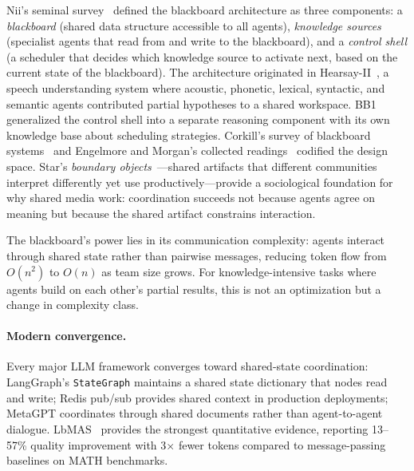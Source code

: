 \documentclass{article}
\begin{document}
Nii's seminal survey~\citep{nii1986blackboard} defined the blackboard architecture as
three components: a \emph{blackboard} (shared data structure accessible to all agents),
\emph{knowledge sources} (specialist agents that read from and write to the blackboard),
and a \emph{control shell} (a scheduler that decides which knowledge source to activate
next, based on the current state of the blackboard). The architecture originated in
Hearsay-II~\citep{erman1980hearsay}, a speech understanding system where acoustic,
phonetic, lexical, syntactic, and semantic agents contributed partial hypotheses to a
shared workspace. BB1~\citep{hayes1985bb1} generalized the control shell into a separate
reasoning component with its own knowledge base about scheduling strategies.
Corkill's survey of blackboard systems~\citep{sutra15605_blackboard1989} and
Engelmore and Morgan's collected readings~\citep{sutra14058_blackboard1985}
codified the design space. Star's \emph{boundary objects}~\citep{sutra19540_structure1989}---shared
artifacts that different communities interpret differently yet use
productively---provide a sociological foundation for why shared media work:
coordination succeeds not because agents agree on meaning but because the shared
artifact constrains interaction.

The blackboard's power lies in its communication complexity: agents interact through
shared state rather than pairwise messages, reducing token flow from $O(n^2)$ to $O(n)$
as team size grows. For knowledge-intensive tasks where agents build on each other's
partial results, this is not an optimization but a change in complexity class.

\paragraph{Modern convergence.}
Every major LLM framework converges toward shared-state coordination: LangGraph's
\texttt{StateGraph} maintains a shared state dictionary that nodes read and write;
Redis pub/sub provides shared context in production deployments; MetaGPT coordinates
through shared documents rather than agent-to-agent dialogue. LbMAS~\citep{lbmas2025}
provides the strongest quantitative evidence, reporting 13--57\% quality improvement
with 3$\times$ fewer tokens compared to message-passing baselines on MATH benchmarks.
\end{document}
